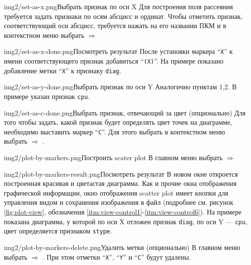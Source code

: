 \documentclass[12pt,tikz]{instruction}
\begin{document}
\begin{steps}
	\begin{ist}{img2/set-as-x.png}{Выбрать признак по оси X}
		Для построения поля рассеяния требуется задать признаки по осям абсцисс и ординат. Чтобы отметить признак, соответствующий оси абсцисс, требуется нажать на его названии ПКМ и в контекстном меню выбрать
		 $\Rightarrow$ 
	\end{ist}
	\begin{ist}{img2/set-as-x-done.png}{Посмотреть результат}
		После установки маркера ``\texttt{X}'' к имени соответствующего признак добавиться ``\texttt{(X)}''. На примере показано добавление метки ``\texttt{X}''  к признаку \texttt{diag}.
	\end{ist}	
	\begin{ist}{img2/set-as-y-done.png}{Выбрать признак по оси Y}
		Аналогично пунктам 1,2. В примере указан признак \texttt{cpu}.
	\end{ist}
	\begin{ist}{img2/set-as-c-done.png}{Выбрать признак, отвечающий за цвет (опционально)}
		Для того чтобы задать, какой признак будет определять цвет точек на диаграмме, необходимо выставить маркер ``\texttt{C}''. Для этого выбрать в контекстном меню выбрать  $\Rightarrow$ . 
	\end{ist}
	\begin{ist}{img2/plot-by-markers.png}{Построить scater plot}
		В главном меню выбрать  $\Rightarrow$  
	\end{ist}
	\begin{ist}{img2/plot-by-markers-result.png}{Посмотреть результат}
		В новом окне откроется построенная красивая и цветастая диаграмма. Как и прочие окна отображения графической информации, окно отображения scatter plot имеет кнопки для управления видом и сохранения изображения в файл (подробнее см. рисунок \ref{fig:plot-view}, обозначения \ref{itm:view-control1}-\ref{itm:view-control6}). На примере показана диаграмма, у которой по оси X отложен признак \texttt{diag}, по оси Y --- \texttt{cpu}, цвет определяется признаком \texttt{stype}.
	\end{ist}
	\begin{ist}{img2/plot-by-markers-delete.png}{Удалить метки (опционально)}
		В главном меню выбрать  $\Rightarrow$ . При этом отметки ``\texttt{X}'', ``\texttt{Y}'' и ``\texttt{C}'' будут удалены.
	\end{ist}
	
\end{steps}
\end{document}
